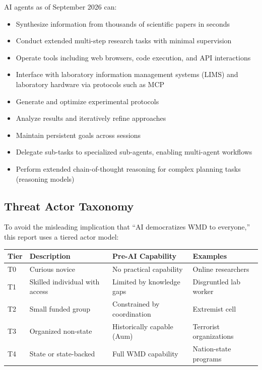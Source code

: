 \documentclass[11pt,letterpaper]{article}
\begin{document}
AI agents as of September 2026 can:
\begin{itemize}[nosep]
  \item Synthesize information from thousands of scientific papers in seconds
  \item Conduct extended multi-step research tasks with minimal supervision
  \item Operate tools including web browsers, code execution, and API interactions
  \item Interface with laboratory information management systems (LIMS) and laboratory hardware via protocols such as MCP
  \item Generate and optimize experimental protocols
  \item Analyze results and iteratively refine approaches
  \item Maintain persistent goals across sessions
  \item Delegate sub-tasks to specialized sub-agents, enabling multi-agent workflows
  \item Perform extended chain-of-thought reasoning for complex planning tasks (reasoning models)
\end{itemize}

\subsection{Threat Actor Taxonomy}

To avoid the misleading implication that ``AI democratizes WMD to everyone,'' this report uses a tiered actor model:

\begin{center}
\small
\begin{tabular}{L{1cm}L{3.5cm}L{3.5cm}L{4cm}}
\toprule
\textbf{Tier} & \textbf{Description} & \textbf{Pre-AI Capability} & \textbf{Examples} \\
\midrule
T0 & Curious novice & No practical capability & Online researchers \\
T1 & Skilled individual with access & Limited by knowledge gaps & Disgruntled lab worker \\
T2 & Small funded group & Constrained by coordination & Extremist cell \\
T3 & Organized non-state & Historically capable (Aum) & Terrorist organizations \\
T4 & State or state-backed & Full WMD capability & Nation-state programs \\
\bottomrule
\end{tabular}
\end{center}
\end{document}
